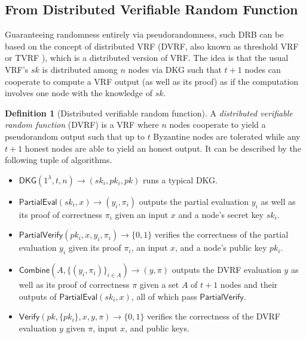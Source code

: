 \documentclass[letterpaper,twocolumn,10pt]{article}
\theoremstyle{definition}
\newtheorem{definition}[theorem]{Definition}
\theoremstyle{remark}
\begin{document}
\subsection{From Distributed Verifiable Random Function}
Guaranteeing randomness entirely via pseudorandomness, such DRB can be based on the concept of distributed VRF \cite{hanke2018dfinity,galindo2020fully} (DVRF, also known as threshold VRF or TVRF \cite{cascudomt}), which is a distributed version of VRF. The idea is that the usual VRF's $sk$ is distributed among $n$ nodes via DKG such that $t + 1$ nodes can cooperate to compute a VRF output (as well as its proof) as if the computation involves one node with the knowledge of $sk$.

\begin{definition}[Distributed verifiable random function]
A \textit{distributed verifiable random function} (DVRF) is a VRF where $n$ nodes cooperate to yield a pseudorandom output such that up to $t$ Byzantine nodes are tolerated while any $t + 1$ honest nodes are able to yield an honest output. It can be described by the following tuple of algorithms.
\begin{itemize}
\item $\mathsf{DKG}(1^\lambda, t, n) \rightarrow (sk_i, pk_i, pk)$ runs a typical DKG.
\item $\mathsf{PartialEval}(sk_i, x) \rightarrow (y_i, \pi_i)$ outputs the partial evaluation $y_i$ as well as its proof of correctness $\pi_i$ given an input $x$ and a node's secret key $sk_i$.
\item $\mathsf{PartialVerify}(pk_i, x, y_i, \pi_i) \rightarrow \{0, 1\}$ verifies the correctness of the partial evaluation $y_i$ given its proof $\pi_i$, an input $x$, and a node's public key $pk_i$.
\item $\mathsf{Combine}(A, \{(y_i, \pi_i)\}_{i \in A}) \rightarrow (y, \pi)$ outputs the DVRF evaluation $y$ as well as its proof of correctness $\pi$ given a set $A$ of $t + 1$ nodes and their outputs of $\mathsf{PartialEval}(sk_i, x)$, all of which pass $\mathsf{PartialVerify}$.
\item $\mathsf{Verify}(pk, \{pk_i\}, x, y, \pi) \rightarrow \{0, 1\}$ verifies the correctness of the DVRF evaluation $y$ given $\pi$, input $x$, and public keys.
\end{itemize}
\end{definition}
\end{document}
